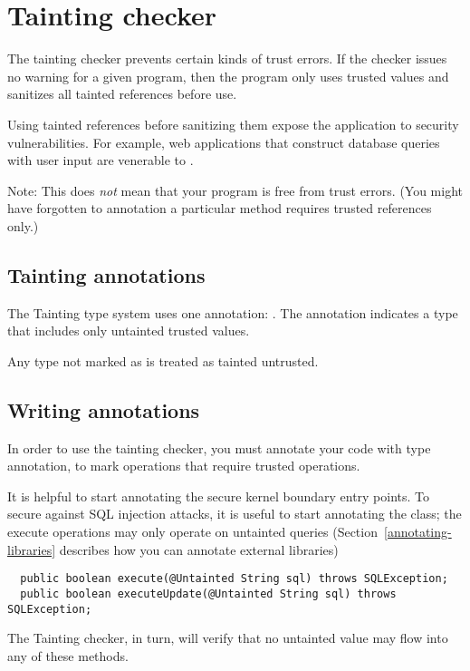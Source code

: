 \htmlhr
\section{Tainting checker\label{tainting-checker}}

The tainting checker prevents certain kinds of trust errors.  If the
checker issues no warning for a given program, then the program only
uses trusted values and sanitizes all tainted references before use.

Using tainted references before sanitizing them expose the application
to security vulnerabilities.  For example, web applications that construct
database queries with user input are venerable to
.

Note: This does \emph{not} mean that your program is free from trust errors.
(You might have forgotten to annotation a particular method requires trusted
references only.)

\subsection{Tainting annotations\label{tainting-annotations}}

The Tainting type system uses one annotation:
.  The annotation indicates
a type that includes only untainted trusted values.

Any type not marked as  is treated as tainted untrusted.

\subsection{Writing  annotations\label{writing-untainted}}

In order to use the tainting checker, you must annotate your code with
 type annotation, to mark
operations that require trusted operations.

It is helpful to start annotating the secure kernel boundary entry
points.  To secure against SQL injection attacks, it is useful to
start annotating the 
class; the execute operations may only operate on untainted queries
(Section~\ref{annotating-libraries} describes how you can annotate
external libraries)

\begin{Verbatim}
  public boolean execute(@Untainted String sql) throws SQLException;
  public boolean executeUpdate(@Untainted String sql) throws SQLException; 
\end{Verbatim}

The Tainting checker, in turn, will verify that no untainted value may flow into
any of these methods.
